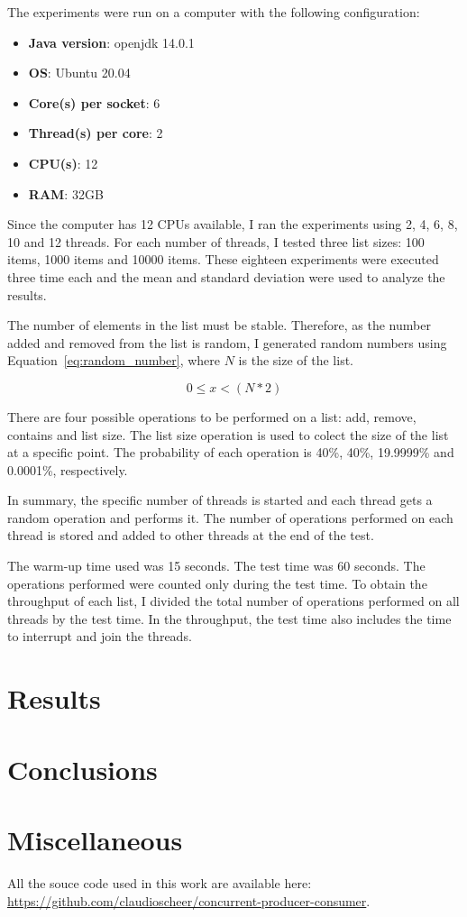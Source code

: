 \documentclass{article}
\begin{document}
The experiments were run on a computer with the following configuration:

\begin{itemize}
    \item \textbf{Java version}: openjdk 14.0.1
    \item \textbf{OS}: Ubuntu 20.04
    \item \textbf{Core(s) per socket}: 6
    \item \textbf{Thread(s) per core}: 2
    \item \textbf{CPU(s)}: 12
    \item \textbf{RAM}: 32GB
\end{itemize}

Since the computer has 12 CPUs available, I ran the experiments using 2, 4, 6, 8, 10 and 12 threads. For each number of threads, I tested three list sizes: 100 items, 1000 items and 10000 items. These eighteen experiments were executed three time each and the mean and standard deviation were used to analyze the results.

The number of elements in the list must be stable. Therefore, as the number added and removed from the list is random, I generated random numbers using Equation~\ref{eq:random_number}, where $N$ is the size of the list.

\begin{equation} \label{eq:random_number}
    0 \leq x < (N * 2)
\end{equation}

There are four possible operations to be performed on a list: add, remove, contains and list size. The list size operation is used to colect the size of the list at a specific point. The probability of each operation is 40\%, 40\%, 19.9999\% and 0.0001\%, respectively.

In summary, the specific number of threads is started and each thread gets a random operation and performs it. The number of operations performed on each thread is stored and added to other threads at the end of the test.

The warm-up time used was 15 seconds. The test time was 60 seconds. The operations performed were counted only during the test time. To obtain the throughput of each list, I divided the total number of operations performed on all threads by the test time. In the throughput, the test time also includes the time to interrupt and join the threads.


\section{Results} \label{section:results}




\section{Conclusions}



\section{Miscellaneous}

All the souce code used in this work are available here: \url{https://github.com/claudioscheer/concurrent-producer-consumer}.
\end{document}
